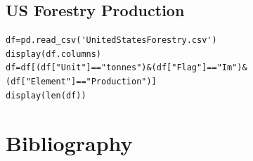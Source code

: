 \documentclass[11pt]{article}
\numberwithin{equation}{section}
\begin{document}
\subsection{US Forestry Production}
\label{sec:orgeccdc04}
\begin{verbatim}
df=pd.read_csv('UnitedStatesForestry.csv')
display(df.columns)
df=df[(df["Unit"]=="tonnes")&(df["Flag"]=="Im")&(df["Element"]=="Production")]
display(len(df))
\end{verbatim}

\section{Bibliography}
\label{sec:orge37f3a1}


\end{document}

